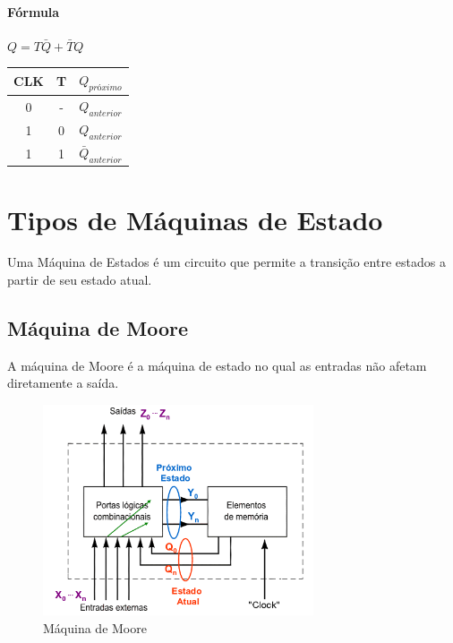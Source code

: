 \documentclass{article}
\begin{document}
            \paragraph{Fórmula}
            $Q = T\bar{Q} + \bar{T}Q$
            \newline
            \newline
            \begin{tabular}{||c c c||}
                \hline
                CLK &   T   &   $Q_{próximo}$       \\
                \hline\hline
                0   &   -   &   $Q_{anterior}$      \\
                1   &   0   &   $Q_{anterior}$      \\
                1   &   1   &   $\bar{Q}_{anterior}$\\
                \hline
            \end{tabular}

    \section{Tipos de Máquinas de Estado}

        Uma Máquina de Estados é um circuito que permite a transição entre estados a partir de seu estado atual.

        \subsection{Máquina de Moore}
            A máquina de Moore é a máquina de estado no qual as entradas não afetam diretamente a saída.

            \begin{figure} [H] 
                \includegraphics[width=8cm]{fsm-moore.png}
                \caption{Máquina de Moore}
                \label{fig:fsm-moore}
            \end{figure}
\end{document}
